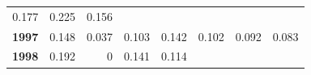 \documentclass[]{article}
\begin{document}
\begin{longtable}[]{@{}rrrrrrrr@{}}
\begin{minipage}[t]{0.09\columnwidth}
0.177\strut
\end{minipage} & \begin{minipage}[t]{0.08\columnwidth}\raggedleft\strut
0.225\strut
\end{minipage} & \begin{minipage}[t]{0.10\columnwidth}\raggedleft\strut
0.156\strut
\end{minipage}\tabularnewline
\begin{minipage}[t]{0.08\columnwidth}\raggedleft\strut
\textbf{1997}\strut
\end{minipage} & \begin{minipage}[t]{0.10\columnwidth}\raggedleft\strut
0.148\strut
\end{minipage} & \begin{minipage}[t]{0.11\columnwidth}\raggedleft\strut
0.037\strut
\end{minipage} & \begin{minipage}[t]{0.08\columnwidth}\raggedleft\strut
0.103\strut
\end{minipage} & \begin{minipage}[t]{0.14\columnwidth}\raggedleft\strut
0.142\strut
\end{minipage} & \begin{minipage}[t]{0.09\columnwidth}\raggedleft\strut
0.102\strut
\end{minipage} & \begin{minipage}[t]{0.08\columnwidth}\raggedleft\strut
0.092\strut
\end{minipage} & \begin{minipage}[t]{0.10\columnwidth}\raggedleft\strut
0.083\strut
\end{minipage}\tabularnewline
\begin{minipage}[t]{0.08\columnwidth}\raggedleft\strut
\textbf{1998}\strut
\end{minipage} & \begin{minipage}[t]{0.10\columnwidth}\raggedleft\strut
0.192\strut
\end{minipage} & \begin{minipage}[t]{0.11\columnwidth}\raggedleft\strut
0\strut
\end{minipage} & \begin{minipage}[t]{0.08\columnwidth}\raggedleft\strut
0.141\strut
\end{minipage} & \begin{minipage}[t]{0.14\columnwidth}\raggedleft\strut
0.114\strut
\end{minipage} & \begin{minipage}[t]{0.09\columnwidth}\raggedleft\strut

\end{minipage}
\end{longtable}
\end{document}
